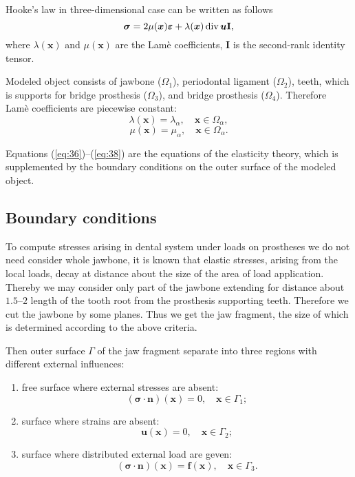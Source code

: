 \documentclass{elsarticle}
\renewcommand{\div}{\mathop{\rm div}\nolimits}
\newcommand{\tensor}[1]{\bm{#1}}
\renewcommand{\vec}[1]{\bm{#1}}
\begin{document}
Hooke's law in three-dimensional case can be written as follows
\begin{equation}
  \label{eq:38}
  \tensor{\sigma} = 2\mu(\vec{x}) \tensor{\varepsilon} +
  \lambda(\vec{x}) \div \vec{u} \mathbf{I},
\end{equation}
where $\lambda(\vec{x})$ and $\mu(\vec{x})$ are the Lam\`e coefficients,
$\mathbf{I}$ is the second-rank identity tensor.

Modeled object consists of jawbone ($\Omega_1$), periodontal ligament
($\Omega_2$), teeth, which is supports for bridge prosthesis
($\Omega_3$), and bridge prosthesis ($\Omega_4$). Therefore Lam\`e
coefficients are piecewise constant:
\begin{equation}
  \label{eq:2.5}
  \lambda(\vec{x}) = \lambda_\alpha, \quad \vec{x} \in \Omega_\alpha,
\end{equation}
\begin{equation}
  \label{eq:2.5}
  \mu(\vec{x}) = \mu_\alpha, \quad \vec{x} \in \Omega_\alpha.
\end{equation}

Equations (\ref{eq:36})--(\ref{eq:38}) are the equations of the
elasticity theory, which is supplemented by the boundary conditions on
the outer surface of the modeled object. 


\subsection{Boundary conditions} 

To compute stresses arising in dental system under loads on prostheses
we do not need consider whole jawbone, it is known that elastic
stresses, arising from the local loads, decay at distance about the
size of the area of load application. Thereby we may consider only
part of the jawbone extending for distance about $1.5$--$2$ length of
the tooth root from the prosthesis supporting teeth. Therefore we cut the
jawbone by some planes. Thus we get the jaw fragment, the size of
which is determined according to the above criteria.

Then outer surface $\Gamma$ of the jaw fragment separate into three
regions with different external influences:
\begin{enumerate}
\item free surface where external stresses are absent:
  \begin{equation}
    \label{eq:2.1}
    (\tensor{\sigma}\cdot \vec{n})(\vec{x}) = 0, \quad \vec{x} \in \Gamma_1 ;
  \end{equation}
\item surface where strains are absent: 
  \begin{equation}
    \label{eq:2.2}
    \vec{u}(\vec{x}) = 0, \quad \vec{x} \in \Gamma_2 ;
  \end{equation}
\item surface where distributed external load are geven:
  \begin{equation}
    \label{eq:2.3}
    (\tensor{\sigma}\cdot \vec{n})(\vec{x}) = \vec{f}(\vec{x}), \quad \mathbf{x} \in \Gamma_3 .
  \end{equation}
\end{enumerate}
\end{document}
